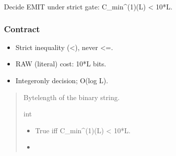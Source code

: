 \documentclass[letterpaper,10pt,english]{sphinxmanual}
\begin{document}

\begin{fulllineitems}
\label{\detokenize{clf_calculator:id4}}
\pysigstartsignatures
\pysiglinewithargsret
{}
{}
{}
\pysigstopsignatures
\sphinxAtStartPar
Decide EMIT under strict gate: C\_min\textasciicircum{}(1)(L) \textless{} 10*L.


\subsubsection{Contract}
\label{\detokenize{clf_calculator:id5}}\begin{itemize}
\item {} 
\sphinxAtStartPar
Strict inequality (\textless{}), never \textless{}=.

\item {} 
\sphinxAtStartPar
RAW (literal) cost: 10*L bits.

\item {} 
\sphinxAtStartPar
Integer\sphinxhyphen{}only decision; O(log L).

\end{itemize}
\begin{quote}\begin{description}
\sphinxAtStartPar
{}

\sphinxAtStartPar
Byte\sphinxhyphen{}length of the binary string.

\sphinxAtStartPar
int

\sphinxAtStartPar
{}

\begin{itemize}
\item {} 
\sphinxAtStartPar
{} \textendash{} True iff C\_min\textasciicircum{}(1)(L) \textless{} 10*L.

\item {} 
\sphinxAtStartPar
{}


\end{itemize}
\end{description}
\end{quote}
\end{fulllineitems}
\end{document}
